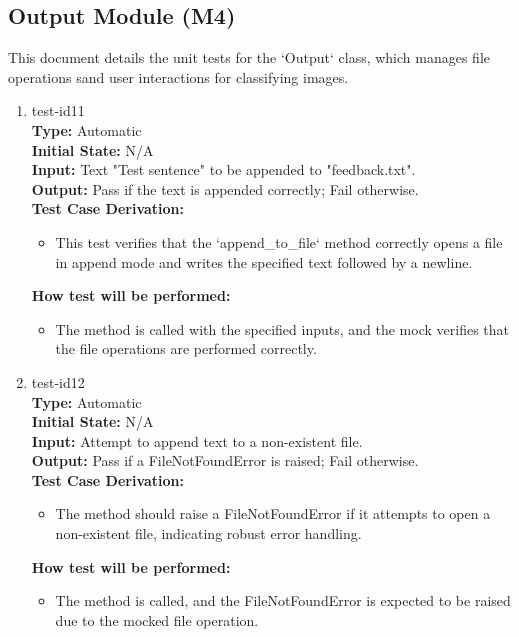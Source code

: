 \documentclass[12pt, titlepage]{article}
\begin{document}
\subsection{ Output Module (M4)} 
This document details the unit tests for the `Output` class, which manages file operations 
sand user interactions for classifying images.

\begin{enumerate}

\item{test-id11\\}
\textbf{Type:} Automatic\\
\textbf{Initial State:} N/A\\
\textbf{Input:} Text "Test sentence" to be appended to "feedback.txt".\\
\textbf{Output:} Pass if the text is appended correctly; Fail otherwise.\\
\textbf{Test Case Derivation:}
\begin{itemize}
    \item This test verifies that the `append\_to\_file` method correctly 
    opens a file in append mode and writes the specified text followed by a newline.
\end{itemize}
\textbf{How test will be performed:}
\begin{itemize}
    \item The method is called with the specified inputs, and the mock 
    verifies that the file operations are performed correctly.
\end{itemize}

\item{test-id12\\}
\textbf{Type:} Automatic\\
\textbf{Initial State:} N/A\\
\textbf{Input:} Attempt to append text to a non-existent file.\\
\textbf{Output:} Pass if a FileNotFoundError is raised; Fail otherwise.\\
\textbf{Test Case Derivation:}
\begin{itemize}
    \item The method should raise a FileNotFoundError if it attempts to 
    open a non-existent file, indicating robust error handling.
\end{itemize}
\textbf{How test will be performed:}
\begin{itemize}
    \item The method is called, and the FileNotFoundError is expected to 
    be raised due to the mocked file operation.
\end{itemize}


\end{enumerate}
\end{document}
